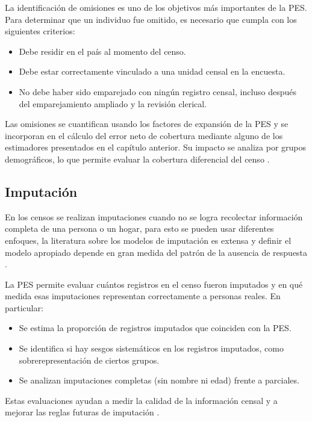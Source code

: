 \documentclass[
  12pt,
]{book}
\providecommand{\tightlist}{%
  \setlength{\itemsep}{0pt}\setlength{\parskip}{0pt}}
\begin{document}
La identificación de omisiones es uno de los objetivos más importantes de la PES. Para determinar que un individuo fue omitido, es necesario que cumpla con los siguientes criterios:

\begin{itemize}
\tightlist
\item
  Debe residir en el país al momento del censo.
\item
  Debe estar correctamente vinculado a una unidad censal en la encuesta.
\item
  No debe haber sido emparejado con ningún registro censal, incluso después del emparejamiento ampliado y la revisión clerical.
\end{itemize}

Las omisiones se cuantifican usando los factores de expansión de la PES y se incorporan en el cálculo del error neto de cobertura mediante alguno de los estimadores presentados en el capítulo anterior. Su impacto se analiza por grupos demográficos, lo que permite evaluar la cobertura diferencial del censo \citep{wolter1986coverage, USCensusBureau_2022}.

\subsection{Imputación}\label{imputaciuxf3n}

En los censos se realizan imputaciones cuando no se logra recolectar información completa de una persona o un hogar, para esto se pueden usar diferentes enfoques, la literatura sobre los modelos de imputación es extensa y definir el modelo apropiado depende en gran medida del patrón de la ausencia de respuesta \citep{van2012flexible}.

La PES permite evaluar cuántos registros en el censo fueron imputados y en qué medida esas imputaciones representan correctamente a personas reales. En particular:

\begin{itemize}
\tightlist
\item
  Se estima la proporción de registros imputados que coinciden con la PES.
\item
  Se identifica si hay sesgos sistemáticos en los registros imputados, como sobrerepresentación de ciertos grupos.
\item
  Se analizan imputaciones completas (sin nombre ni edad) frente a parciales.
\end{itemize}

Estas evaluaciones ayudan a medir la calidad de la información censal y a mejorar las reglas futuras de imputación \citep{biemer2003introduction, USCensusBureau_2022}.
\end{document}
